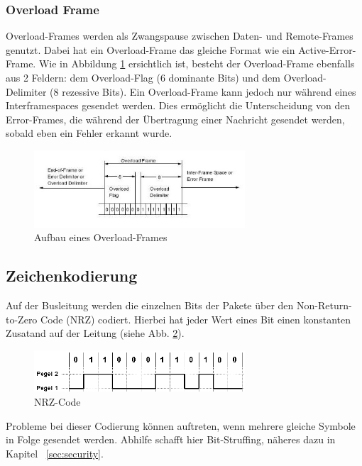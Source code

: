 \subsubsection{Overload Frame} Overload-Frames werden als Zwangspause
zwischen Daten- und Remote-Frames genutzt. Dabei hat ein
Overload-Frame das gleiche Format wie ein Active-Error-Frame. Wie in
Abbildung \ref{overload} ersichtlich ist, besteht der Overload-Frame
ebenfalls aus 2 Feldern: dem Overload-Flag (6 dominante Bits) und dem
Overload-Delimiter (8 rezessive Bits). Ein Overload-Frame kann jedoch
nur während eines Interframespaces gesendet werden. Dies ermöglicht
die Unterscheidung von den Error-Frames, die während der Übertragung
einer Nachricht gesendet werden, sobald eben ein Fehler erkannt wurde.

	
\begin{figure}[h] 
\centering
\includegraphics[width=0.7\textwidth]{figures/overload-frame}
\caption{Aufbau eines Overload-Frames \citep{CBM}} 
\label{overload}
\end{figure} 
	
\subsection{Zeichenkodierung}
	
Auf der Busleitung werden die einzelnen Bits der Pakete über den 
Non-Return-to-Zero Code (NRZ) codiert. Hierbei hat jeder Wert eines Bit 
einen konstanten Zusatand auf der Leitung (siehe Abb. \ref{nrzcode}).

\begin{figure}[h] 
\centering
\includegraphics[width=0.7\textwidth]{figures/nrzcode}
\caption{NRZ-Code \citep{NRZ}} 
\label{nrzcode}
\end{figure} 

Probleme bei dieser Codierung können auftreten, wenn mehrere gleiche Symbole in Folge
gesendet werden. Abhilfe schafft hier Bit-Struffing, näheres dazu in Kapitel ~\ref{sec:security}.


